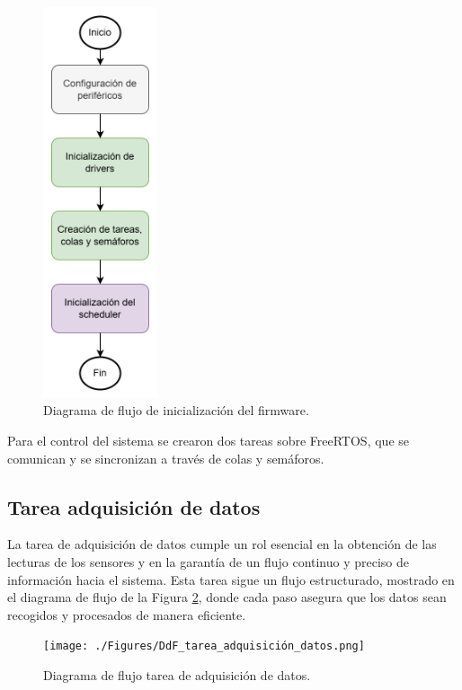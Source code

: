 \vspace{1cm}
\begin{figure}[htbp]
	\centering
	\includegraphics[width=0.3\textwidth, height=0.6\textheight]{./Figures/DdF_firmware.png}
	\caption{Diagrama de flujo de inicialización del firmware.}
	\label{fig:DdF_firmware}
\end{figure}
\vspace{1cm}

Para el control del sistema se crearon dos tareas sobre FreeRTOS, que se comunican
y se sincronizan a través de colas y semáforos.

\subsection{Tarea adquisición de datos}

La tarea de adquisición de datos cumple un rol esencial en la obtención de las lecturas de los sensores y en la garantía de un flujo continuo y preciso de información hacia el sistema. Esta tarea sigue un flujo estructurado, mostrado en el diagrama de flujo de la Figura \ref{fig:DdF_tarea_adquisición_datos}, donde cada paso asegura que los datos sean recogidos y procesados de manera eficiente.

\vspace{1cm}
\begin{figure}[htbp]
	\centering
	\texttt{[image: ./Figures/DdF\_tarea\_adquisición\_datos.png]}
	\caption{Diagrama de flujo tarea de adquisición de datos.}
	\label{fig:DdF_tarea_adquisición_datos}
\end{figure}
\vspace{1cm}

